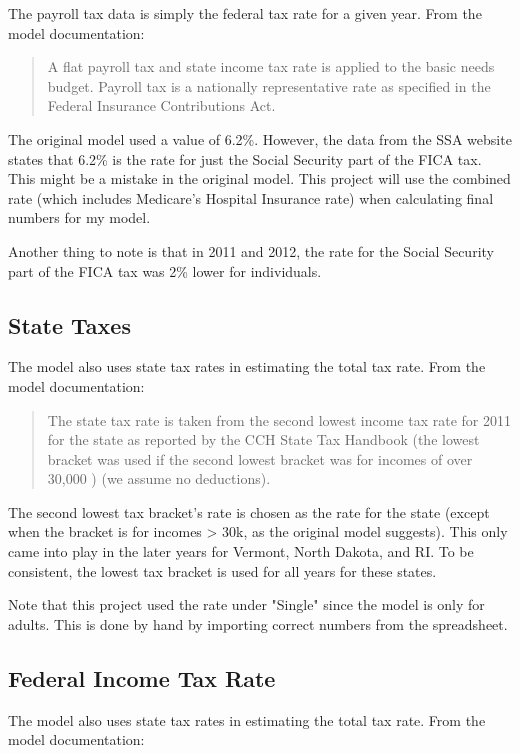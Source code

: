 The payroll tax data is simply the federal tax rate for a given year. From the model documentation:

\begin{quote}
A flat payroll tax and state income tax rate is applied to the basic needs budget. Payroll tax is a nationally representative rate as specified in the Federal Insurance Contributions Act.
\end{quote}

The original model used a value of 6.2\%. However, the data from the SSA website states that 6.2\% is the rate for just the Social Security part of the FICA tax. This might be a mistake in the original model. This project will use the combined rate (which includes Medicare's Hospital Insurance rate) when calculating final numbers for my model.

Another thing to note is that in 2011 and 2012, the rate for the Social Security part of the FICA tax was 2\% lower for individuals.

\subsection{State Taxes}

The model also uses state tax rates in estimating the total tax rate. From the model documentation: 

\begin{quote}
The state tax rate is taken from the second lowest income tax rate for 2011 for the state as reported by the CCH State Tax Handbook (the lowest bracket was used if the second lowest bracket was for incomes of over 30,000 ) (we assume no deductions).
\end{quote}

The second lowest tax bracket's rate is chosen as the rate for the state (except when the bracket is for incomes > 30k, as the original model suggests). This only came into play in the later years for Vermont, North Dakota, and RI. To be consistent, the lowest tax bracket is used for all years for these states.

Note that this project used the rate under "Single" since the model is only for adults. This is done by hand by importing correct numbers from the spreadsheet.

\subsection{Federal Income Tax Rate}

The model also uses state tax rates in estimating the total tax rate. From the model documentation: 

